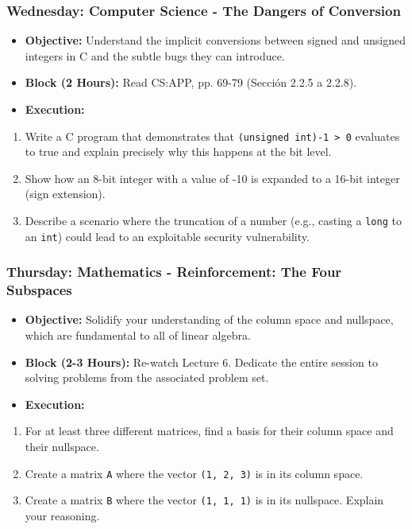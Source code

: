 \subsubsection{\textbf{Wednesday: Computer Science - The Dangers of Conversion}}
\begin{itemize}
  \item \textbf{Objective:} Understand the implicit conversions between signed and unsigned integers in C and the subtle bugs they can introduce.
  \item \textbf{Block (2 Hours):} Read CS:APP, pp. 69-79 (Sección 2.2.5 a 2.2.8).
  \item \textbf{Execution:}
\end{itemize}
\begin{enumerate}
  \item Write a C program that demonstrates that \texttt{(unsigned int)-1 \textgreater{} 0} evaluates to true and explain precisely why this happens at the bit level.
  \item Show how an 8-bit integer with a value of -10 is expanded to a 16-bit integer (sign extension).
  \item Describe a scenario where the truncation of a number (e.g., casting a \texttt{long} to an \texttt{int}) could lead to an exploitable security vulnerability.

\end{enumerate}
\subsubsection{\textbf{Thursday: Mathematics - Reinforcement: The Four Subspaces}}
\begin{itemize}
  \item \textbf{Objective:} Solidify your understanding of the column space and nullspace, which are fundamental to all of linear algebra.
  \item \textbf{Block (2-3 Hours):} Re-watch Lecture 6. Dedicate the entire session to solving problems from the associated problem set.
  \item \textbf{Execution:}
\end{itemize}
\begin{enumerate}
  \item For at least three different matrices, find a basis for their column space and their nullspace.
  \item Create a matrix \texttt{A} where the vector \texttt{(1, 2, 3)} is in its column space.
  \item Create a matrix \texttt{B} where the vector \texttt{(1, 1, 1)} is in its nullspace. Explain your reasoning.

\end{enumerate}
